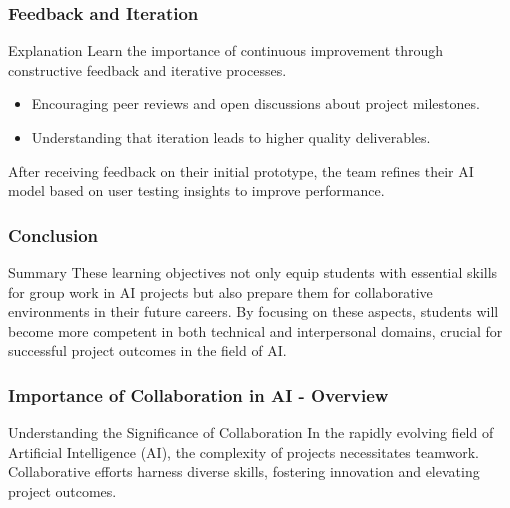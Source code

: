 \documentclass[aspectratio=169]{beamer}
\begin{document}
\begin{frame}[fragile]
    \frametitle{Feedback and Iteration}
    \begin{block}{Explanation}
        Learn the importance of continuous improvement through constructive feedback and iterative processes.
    \end{block}
    \begin{itemize}
        \item Encouraging peer reviews and open discussions about project milestones.
        \item Understanding that iteration leads to higher quality deliverables.
    \end{itemize}
    \begin{example}
        After receiving feedback on their initial prototype, the team refines their AI model based on user testing insights to improve performance.
    \end{example}
\end{frame}

\begin{frame}[fragile]
    \frametitle{Conclusion}
    \begin{block}{Summary}
        These learning objectives not only equip students with essential skills for group work in AI projects but also prepare them for collaborative environments in their future careers. 
        By focusing on these aspects, students will become more competent in both technical and interpersonal domains, crucial for successful project outcomes in the field of AI.
    \end{block}
\end{frame}

\begin{frame}[fragile]
    \frametitle{Importance of Collaboration in AI - Overview}
    \begin{block}{Understanding the Significance of Collaboration}
        In the rapidly evolving field of Artificial Intelligence (AI), the complexity of projects necessitates teamwork. Collaborative efforts harness diverse skills, fostering innovation and elevating project outcomes.
    \end{block}
\end{frame}
\end{document}
